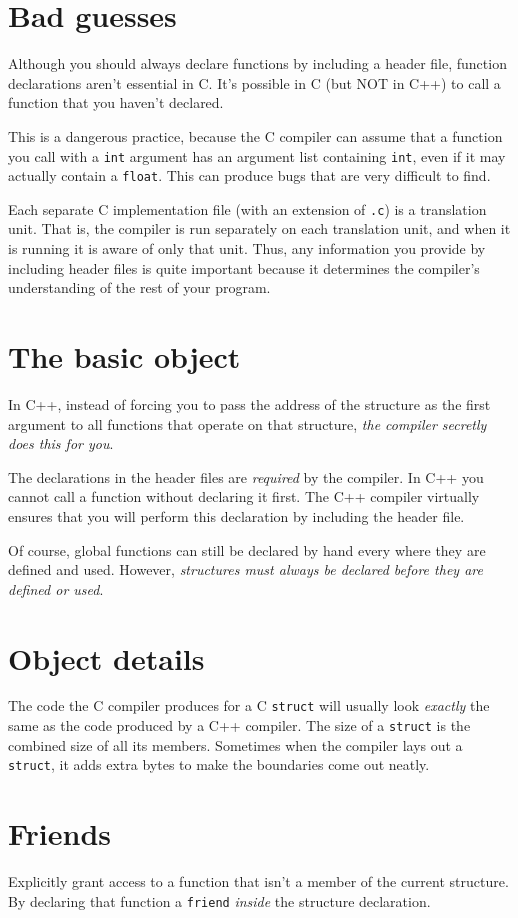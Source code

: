 \documentclass[11pt, a4paper]{book}
\begin{document}
\section{Bad guesses}
Although you should always declare functions by including a header file,
function declarations aren't essential in C. It's possible in C (but NOT in C++)
to call a function that you haven't declared.

This is a dangerous practice, because the C compiler can assume that a function
you call with a \verb|int| argument has an argument list containing \verb|int|,
even if it may actually contain a \verb|float|. This can produce bugs that are
very difficult to find.

Each separate C implementation file (with an extension of \verb|.c|) is a
translation unit. That is, the compiler is run separately on each translation
unit, and when it is running it is aware of only that unit. Thus, any
information you provide by including header files is quite important because
it determines the compiler's understanding of the rest of your program.

\section{The basic object}
In C++, instead of forcing you to pass the address of the structure as the first
argument to all functions that operate on that structure, \emph{the compiler
secretly does this for you}.

The declarations in the header files are \emph{required} by the compiler. In C++
you cannot call a function without declaring it first. The C++ compiler
virtually ensures that you will perform this declaration by including the header
file.

Of course, global functions can still be declared by hand every where they are
defined and used. However, \emph{structures must always be declared before they
are defined or used}.
\section{Object details}
The code the C compiler produces for a C \verb|struct| will usually look
\emph{exactly} the same as the code produced by a C++ compiler. The size of a
\verb|struct| is the combined size of all its members. Sometimes when the
compiler lays out a \verb|struct|, it adds extra bytes to make the boundaries
come out neatly.
\section{Friends}
Explicitly grant access to a function that isn't a member of the current
structure. By declaring that function a \verb|friend| \emph{inside} the
structure declaration. 
\end{document}
